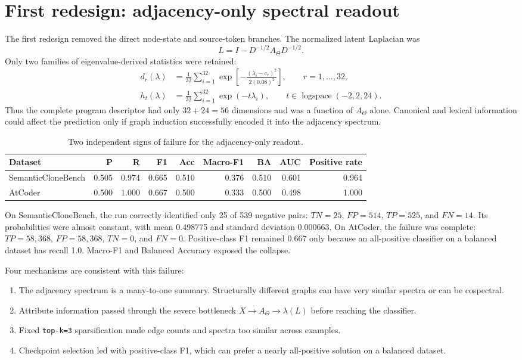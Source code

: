 \documentclass[11pt,a4paper]{article}
\newcommand{\code}[1]{\texttt{#1}}
\begin{document}
\section{First redesign: adjacency-only spectral readout}

The first redesign removed the direct node-state and source-token branches.
The normalized latent Laplacian was
\begin{equation}
L=I-D^{-1/2}A_\Theta D^{-1/2}.
\end{equation}
Only two families of eigenvalue-derived statistics were retained:
\begin{align}
d_r(\lambda)&=\frac{1}{32}\sum_{i=1}^{32}
\exp\left[-\frac{(\lambda_i-c_r)^2}{2(0.08)^2}\right],
\qquad r=1,\ldots,32,\\
h_t(\lambda)&=\frac{1}{32}\sum_{i=1}^{32}\exp(-t\lambda_i),
\qquad t\in\operatorname{logspace}(-2,2,24).
\end{align}
Thus the complete program descriptor had only $32+24=56$ dimensions and was a
function of $A_\Theta$ alone. Canonical and lexical information could affect
the prediction only if graph induction successfully encoded it into the
adjacency spectrum.

\begin{table}[H]
\centering
\small
\begin{tabular}{lrrrrrrrr}
\toprule
Dataset & P & R & F1 & Acc & Macro-F1 & BA & AUC & Positive rate \\
\midrule
SemanticCloneBench & 0.505 & 0.974 & 0.665 & 0.510 & 0.376 & 0.510 & 0.601 & 0.964 \\
AtCoder & 0.500 & 1.000 & 0.667 & 0.500 & 0.333 & 0.500 & 0.498 & 1.000 \\
\bottomrule
\end{tabular}
\caption{Two independent signs of failure for the adjacency-only readout.}
\end{table}

On SemanticCloneBench, the run correctly identified only 25 of 539 negative
pairs: $TN=25$, $FP=514$, $TP=525$, and $FN=14$. Its probabilities were almost
constant, with mean 0.498775 and standard deviation 0.000663. On AtCoder, the
failure was complete: $TP=58{,}368$, $FP=58{,}368$, $TN=0$, and $FN=0$.
Positive-class F1 remained 0.667 only because an all-positive classifier on a
balanced dataset has recall 1.0. Macro-F1 and Balanced Accuracy exposed the
collapse.

Four mechanisms are consistent with this failure:
\begin{enumerate}
\item The adjacency spectrum is a many-to-one summary. Structurally different
graphs can have very similar spectra or can be cospectral.
\item Attribute information passed through the severe bottleneck
$X\rightarrow A_\Theta\rightarrow\lambda(L)$ before reaching the classifier.
\item Fixed \code{top-k=3} sparsification made edge counts and spectra too
similar across examples.
\item Checkpoint selection led with positive-class F1, which can prefer a
nearly all-positive solution on a balanced dataset.
\end{enumerate}
\end{document}
